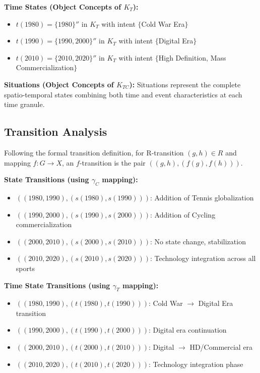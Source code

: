 \documentclass{article}
\begin{document}
\textbf{Time States (Object Concepts of $K_T$):}
\begin{itemize}
    \item $t(1980) = \{1980\}''$ in $K_T$ with intent $\{$Cold War Era$\}$
    \item $t(1990) = \{1990, 2000\}''$ in $K_T$ with intent $\{$Digital Era$\}$
    \item $t(2010) = \{2010, 2020\}''$ in $K_T$ with intent $\{$High Definition, Mass Commercialization$\}$
\end{itemize}

\textbf{Situations (Object Concepts of $K_{TC}$):}
Situations represent the complete spatio-temporal states combining both time and event characteristics at each time granule.

\subsection*{Transition Analysis}

Following the formal transition definition, for R-transition $(g,h) \in R$ and mapping $f: G \rightarrow X$, an $f$-transition is the pair $((g,h), (f(g), f(h)))$.

\textbf{State Transitions (using $\gamma_C$ mapping):}
\begin{itemize}
    \item $((1980,1990), (s(1980), s(1990)))$: Addition of Tennis globalization
    \item $((1990,2000), (s(1990), s(2000)))$: Addition of Cycling commercialization  
    \item $((2000,2010), (s(2000), s(2010)))$: No state change, stabilization
    \item $((2010,2020), (s(2010), s(2020)))$: Technology integration across all sports
\end{itemize}

\textbf{Time State Transitions (using $\gamma_T$ mapping):}
\begin{itemize}
    \item $((1980,1990), (t(1980), t(1990)))$: Cold War $\rightarrow$ Digital Era transition
    \item $((1990,2000), (t(1990), t(2000)))$: Digital era continuation
    \item $((2000,2010), (t(2000), t(2010)))$: Digital $\rightarrow$ HD/Commercial era
    \item $((2010,2020), (t(2010), t(2020)))$: Technology integration phase
\end{itemize}
\end{document}
